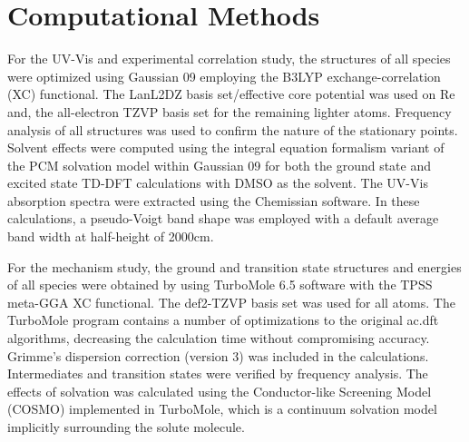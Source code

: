 \section{Computational Methods}\label{sec.compmethods}
For the UV-Vis and experimental correlation study, the structures of all species were optimized using Gaussian 09\autocite{gaussian} employing the B3LYP\autocite{becke1993, lee1988}  exchange-correlation (XC) functional. The LanL2DZ basis set/effective core potential\autocite{hay1985} was used on Re and, the all-electron TZVP basis set\autocite{schafer1994} for the remaining lighter atoms. Frequency analysis of all structures was used to confirm the nature of the stationary points. Solvent effects were computed using the integral equation formalism variant of the PCM solvation model within Gaussian 09 for both the ground state and excited state TD-DFT calculations with DMSO as the solvent\autocite{tomasi2005, scalmani2006}. The UV-Vis absorption spectra were extracted using the Chemissian software\autocite{chemissian}. In these calculations, a pseudo-Voigt band shape was employed with a default average band width at half-height of 2000cm.

For the mechanism study, the ground and transition state structures and energies of all species were obtained by using TurboMole  6.5 software\autocite{turbomole, ahlrichs1989} with the TPSS meta-GGA XC functional\autocite{tao2003}. The def2-TZVP basis set was used for all atoms\autocite{schafer1994, weigend2005}. The TurboMole program contains a number of optimizations to the original \gls{ac.dft} algorithms\autocite{haase1993, treutler1995, eichkorn1997, eichkorn1995, sierka2003, deglmann2004, weigend2002, vonarnim1998, ahlrichs2004}, decreasing the calculation time without compromising accuracy. Grimme's dispersion correction (version 3) was included in the calculations\autocite{grimme2010}. Intermediates and transition states were verified by frequency analysis\autocite{deglmann2004, deglmann2002, grimme2002}. The effects of solvation was calculated using the Conductor-like Screening Model (COSMO) implemented in TurboMole\autocite{klamt1993}, which is a continuum solvation model implicitly surrounding the solute molecule.

